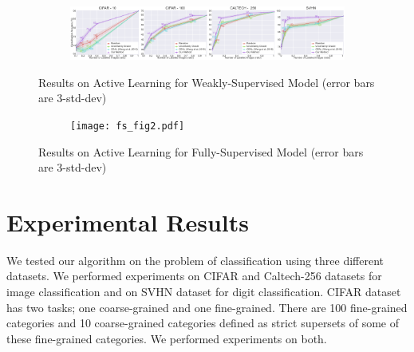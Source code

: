 \documentclass{article}
\begin{document}
\begin{figure}[ht]
    \centering
    \begin{subfigure}[b]{\textwidth}
        \includegraphics[width=\textwidth]{ws_fig2.pdf}
    \end{subfigure}
    \vspace{-5mm}
    \caption{Results on Active Learning for Weakly-Supervised Model (error bars are 3-std-dev)}\label{fig:ressemi}
        \vspace{-3mm}
    \label{fig:resns}
   \vspace{5mm}
    \begin{subfigure}[b]{\textwidth}
        \texttt{[image: fs\_fig2.pdf]}
    \end{subfigure}
        \vspace{-5mm}
    \caption{Results on Active Learning for Fully-Supervised Model (error bars are 3-std-dev)}\label{fig:resnosemi}
        \vspace{-5mm}
    \label{fig:ress}
\end{figure}

\section{Experimental Results}
\label{sec:exp}
We tested our algorithm on the problem of classification using three different datasets. We performed experiments on CIFAR\cite{cifar} and Caltech-256\cite{caltech256} datasets for image classification and on SVHN\cite{svhn} dataset for digit classification. CIFAR\cite{cifar} dataset has two tasks; one coarse-grained and one fine-grained. There are 100 fine-grained categories and 10 coarse-grained categories defined as strict supersets of some of these fine-grained categories. We performed experiments on both.
\end{document}
